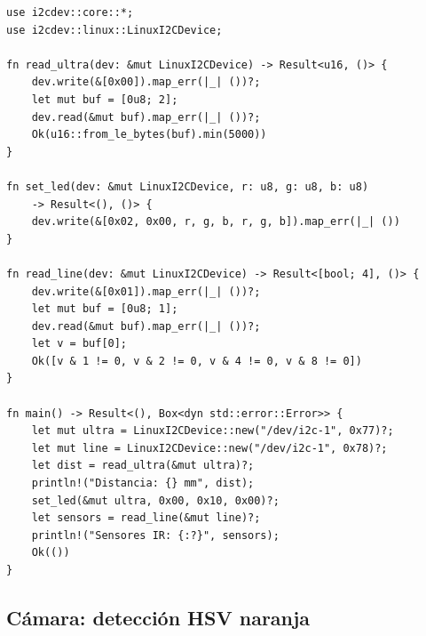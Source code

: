 \documentclass[11pt,a4paper]{article}
\begin{document}
\begin{lstlisting}[style=ruststyle]
use i2cdev::core::*;
use i2cdev::linux::LinuxI2CDevice;

fn read_ultra(dev: &mut LinuxI2CDevice) -> Result<u16, ()> {
    dev.write(&[0x00]).map_err(|_| ())?;
    let mut buf = [0u8; 2];
    dev.read(&mut buf).map_err(|_| ())?;
    Ok(u16::from_le_bytes(buf).min(5000))
}

fn set_led(dev: &mut LinuxI2CDevice, r: u8, g: u8, b: u8)
    -> Result<(), ()> {
    dev.write(&[0x02, 0x00, r, g, b, r, g, b]).map_err(|_| ())
}

fn read_line(dev: &mut LinuxI2CDevice) -> Result<[bool; 4], ()> {
    dev.write(&[0x01]).map_err(|_| ())?;
    let mut buf = [0u8; 1];
    dev.read(&mut buf).map_err(|_| ())?;
    let v = buf[0];
    Ok([v & 1 != 0, v & 2 != 0, v & 4 != 0, v & 8 != 0])
}

fn main() -> Result<(), Box<dyn std::error::Error>> {
    let mut ultra = LinuxI2CDevice::new("/dev/i2c-1", 0x77)?;
    let mut line = LinuxI2CDevice::new("/dev/i2c-1", 0x78)?;
    let dist = read_ultra(&mut ultra)?;
    println!("Distancia: {} mm", dist);
    set_led(&mut ultra, 0x00, 0x10, 0x00)?;
    let sensors = read_line(&mut line)?;
    println!("Sensores IR: {:?}", sensors);
    Ok(())
}
\end{lstlisting}

\subsection{C\'{a}mara: detecci\'{o}n HSV naranja}
\end{document}
